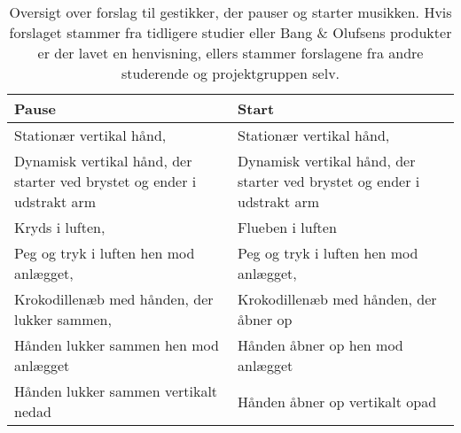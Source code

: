 \begin{table}[H]
	\centering
	\begin{tabular}{| p{6cm} | p{6cm} | }
		\hline
		\textbf{Pause} & \textbf{Start} \\ \hline
		Stationær vertikal hånd, \parencite[s. 166]{PDF:ComparingInputModalities} & Stationær vertikal hånd, \parencite[s. 166]{PDF:ComparingInputModalities} \\ \hline
		Dynamisk vertikal hånd, der starter ved brystet og ender i udstrakt arm  & Dynamisk vertikal hånd, der starter ved brystet og ender i udstrakt arm  \\ \hline
		Kryds i luften, \parencite[s. 48]{PDF:UserDefinedGesturesTV} & Flueben i luften \\ \hline
		Peg og tryk i luften hen mod anlægget, \parencite{WEB:BeosoundMoment, WEB:Beosound2} & Peg og tryk i luften hen mod anlægget, \parencite[s. 48]{PDF:UserDefinedGesturesTV} \\ \hline
		Krokodillenæb med hånden, der lukker sammen, \parencite[s. 48]{WEB:BeosoundMoment, WEB:Beosound2, PDF:UserDefinedGesturesTV} & Krokodillenæb med hånden, der åbner op \\ \hline
		Hånden lukker sammen hen mod anlægget & Hånden åbner op hen mod anlægget \\ \hline
		Hånden lukker sammen vertikalt nedad & Hånden åbner op vertikalt opad  \\ \hline
	\end{tabular}
	\caption{Oversigt over forslag til gestikker, der pauser og starter musikken. Hvis forslaget stammer fra tidligere studier eller Bang $\&$ Olufsens produkter er der lavet en henvisning, ellers stammer forslagene fra andre studerende og projektgruppen selv.}
	\label{tab:IndsamledeGestikkerPause}
\end{table}
\noindent

